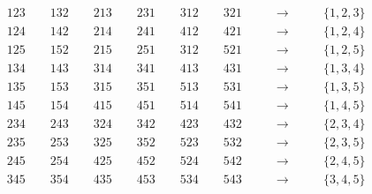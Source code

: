 \documentclass[handout]{beamer} %
\begin{document}
    \begin{frame}    
        
        \pause
        \begin{align*}
            &1 2 3 \qquad  1 3 2  \qquad  2 1 3  \qquad 2 3 1  \qquad  3 1 2  \qquad  3 2 1 \qquad    &\to \qquad &\{1,2,3\}\\
            &1 2 4  \qquad  1 4 2  \qquad  2 1 4  \qquad 2 4 1  \qquad  4 1 2  \qquad  4 2 1  \qquad    &\to \qquad &\{1,2,4\}\\
            &1 2 5  \qquad  1 5 2  \qquad  2 1 5  \qquad 2 5 1  \qquad  3 1 2  \qquad  5 2 1  \qquad    &\to \qquad &\{1,2,5\}\\
            &1 3 4  \qquad  1 43  \qquad  3 1 4  \qquad 34 1  \qquad  4 1 3  \qquad  431  \qquad    &\to \qquad &\{1,3,4\}\\
            &1 3 5  \qquad  1 53  \qquad  3 1 5  \qquad 35 1  \qquad  5 1 3  \qquad  531  \qquad    &\to \qquad &\{1,3,5\}\\
            &1 45  \qquad  1 54  \qquad  4 1 5  \qquad 45 1  \qquad  5 1 4  \qquad  541  \qquad    &\to \qquad &\{1,4,5\}\\
            &234  \qquad  243  \qquad  324  \qquad 342  \qquad  423  \qquad  432  \qquad    &\to \qquad &\{2,3,4\}\\
            &235  \qquad  253  \qquad  325  \qquad 352  \qquad  523  \qquad  532  \qquad    &\to \qquad &\{2,3,5\}\\
            &245  \qquad  254  \qquad  425  \qquad 452  \qquad  524  \qquad  542  \qquad    &\to \qquad &\{2,4,5\}\\
            &345  \qquad  354  \qquad  435 \qquad 453  \qquad  534  \qquad  543  \qquad    &\to \qquad &\{3,4,5\}
        \end{align*}    
        
    \end{frame}
    
    
    
\end{document}
